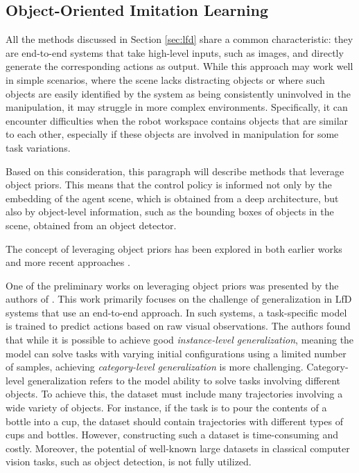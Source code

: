 \subsection{Object-Oriented Imitation Learning}
\label{sec:ooil}
All the methods discussed in Section \ref{sec:lfd} share a common characteristic: they are end-to-end systems that take high-level inputs, such as images, and directly generate the corresponding actions as output. While this approach may work well in simple scenarios, where the scene lacks distracting objects or where such objects are easily identified by the system as being consistently uninvolved in the manipulation, it may struggle in more complex environments. Specifically, it can encounter difficulties when the robot workspace contains objects that are similar to each other, especially if these objects are involved in manipulation for some task variations.

Based on this consideration, this paragraph will describe methods that leverage object priors. This means that the control policy is informed not only by the embedding of the agent scene, which is obtained from a deep architecture, but also by object-level information, such as the bounding boxes of objects in the scene, obtained from an object detector.

The concept of leveraging object priors has been explored in both earlier works \cite{devin2018deep,park2021object} and more recent approaches \cite{belkhale2023plato,zhu2023viola,zhu2023learning,jiang2023vima}.

One of the preliminary works on leveraging object priors was presented by the authors of \cite{devin2018deep}. This work primarily focuses on the challenge of generalization in LfD systems that use an end-to-end approach. In such systems, a task-specific model is trained to predict actions based on raw visual observations. The authors found that while it is possible to achieve good \textit{instance-level generalization}, meaning the model can solve tasks with varying initial configurations using a limited number of samples, achieving \textit{category-level generalization} is more challenging. Category-level generalization refers to the model ability to solve tasks involving different objects. To achieve this, the dataset must include many trajectories involving a wide variety of objects. For instance, if the task is to pour the contents of a bottle into a cup, the dataset should contain trajectories with different types of cups and bottles. However, constructing such a dataset is time-consuming and costly. Moreover, the potential of well-known large datasets in classical computer vision tasks, such as object detection, is not fully utilized.

